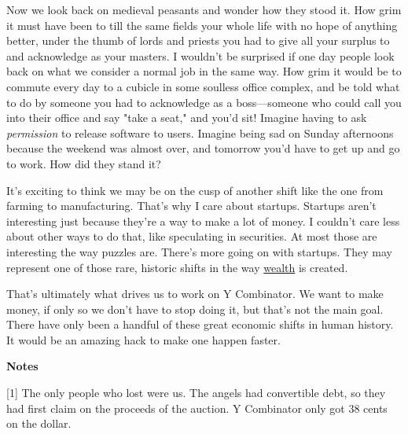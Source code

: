 Now we look back
                    on medieval peasants and wonder how they stood it. How grim
                    it must have been to till the same fields your whole life
                    with no hope of anything better, under the thumb of lords
                    and priests you had to give all your surplus to and
                    acknowledge as your masters. I wouldn't be surprised if one
                    day people look back on what we consider a normal job in the
                    same way. How grim it would be to commute every day to a
                    cubicle in some soulless office complex, and be told what to
                    do by someone you had to acknowledge as a boss---someone
                    who could call you into their office and say "take a seat,"
                    and you'd sit! Imagine having to ask \emph{permission} to
                    release software to users. Imagine being sad on Sunday
                    afternoons because the weekend was almost over, and tomorrow
                    you'd have to get up and go to work. How did they stand
                    it?

It's exciting to think we may be on the cusp
                    of another shift like the one from farming to manufacturing.
                    That's why I care about startups. Startups aren't
                    interesting just because they're a way to make a lot of
                    money. I couldn't care less about other ways to do that,
                    like speculating in securities. At most those are
                    interesting the way puzzles are. There's more going on with
                    startups. They may represent one of those rare, historic
                    shifts in the way \href{http://www.paulgraham.com/wealth.html}{wealth} is
                    created.

That's ultimately what drives us to work
                    on Y Combinator. We want to make money, if only so we don't
                    have to stop doing it, but that's not the main goal. There
                    have only been a handful of these great economic shifts in
                    human history. It would be an amazing hack to make one
                    happen faster.




                    \textbf{Notes}

[1] The only people who lost were us. The angels had
                    convertible debt, so they had first claim on the proceeds of
                    the auction. Y Combinator only got 38 cents on the
                    dollar.

